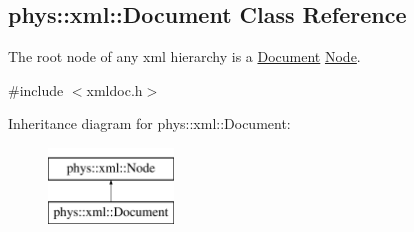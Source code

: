 \hypertarget{classphys_1_1xml_1_1Document}{
\subsection{phys::xml::Document Class Reference}
\label{classphys_1_1xml_1_1Document}
}


The root node of any xml hierarchy is a \hyperlink{classphys_1_1xml_1_1Document}{Document} \hyperlink{classphys_1_1xml_1_1Node}{Node}.  




{\ttfamily \#include $<$xmldoc.h$>$}

Inheritance diagram for phys::xml::Document:\begin{figure}[H]
\begin{center}
\leavevmode
\includegraphics[height=2.000000cm]{classphys_1_1xml_1_1Document}
\end{center}
\end{figure}

